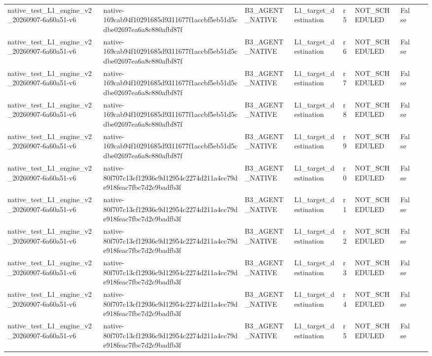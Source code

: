 \begin{tabular}{lllllllll}
native\_test\_L1\_engine\_v2\_20260907-6a60a51-v6 & native-169cab94f10291685d9311677f1accbf5eb51d5cdbe02697ea6a8c880afbf87f & B3\_AGENT\_NATIVE & L1\_target\_destination & r5 & NOT\_SCHEDULED & False &  &  \\
native\_test\_L1\_engine\_v2\_20260907-6a60a51-v6 & native-169cab94f10291685d9311677f1accbf5eb51d5cdbe02697ea6a8c880afbf87f & B3\_AGENT\_NATIVE & L1\_target\_destination & r6 & NOT\_SCHEDULED & False &  &  \\
native\_test\_L1\_engine\_v2\_20260907-6a60a51-v6 & native-169cab94f10291685d9311677f1accbf5eb51d5cdbe02697ea6a8c880afbf87f & B3\_AGENT\_NATIVE & L1\_target\_destination & r7 & NOT\_SCHEDULED & False &  &  \\
native\_test\_L1\_engine\_v2\_20260907-6a60a51-v6 & native-169cab94f10291685d9311677f1accbf5eb51d5cdbe02697ea6a8c880afbf87f & B3\_AGENT\_NATIVE & L1\_target\_destination & r8 & NOT\_SCHEDULED & False &  &  \\
native\_test\_L1\_engine\_v2\_20260907-6a60a51-v6 & native-169cab94f10291685d9311677f1accbf5eb51d5cdbe02697ea6a8c880afbf87f & B3\_AGENT\_NATIVE & L1\_target\_destination & r9 & NOT\_SCHEDULED & False &  &  \\
native\_test\_L1\_engine\_v2\_20260907-6a60a51-v6 & native-80f707c13cf12936c9d12954c2274d211a4cc79de918feac7fbc7d2c9badfb3f & B3\_AGENT\_NATIVE & L1\_target\_destination & r0 & NOT\_SCHEDULED & False &  &  \\
native\_test\_L1\_engine\_v2\_20260907-6a60a51-v6 & native-80f707c13cf12936c9d12954c2274d211a4cc79de918feac7fbc7d2c9badfb3f & B3\_AGENT\_NATIVE & L1\_target\_destination & r1 & NOT\_SCHEDULED & False &  &  \\
native\_test\_L1\_engine\_v2\_20260907-6a60a51-v6 & native-80f707c13cf12936c9d12954c2274d211a4cc79de918feac7fbc7d2c9badfb3f & B3\_AGENT\_NATIVE & L1\_target\_destination & r2 & NOT\_SCHEDULED & False &  &  \\
native\_test\_L1\_engine\_v2\_20260907-6a60a51-v6 & native-80f707c13cf12936c9d12954c2274d211a4cc79de918feac7fbc7d2c9badfb3f & B3\_AGENT\_NATIVE & L1\_target\_destination & r3 & NOT\_SCHEDULED & False &  &  \\
native\_test\_L1\_engine\_v2\_20260907-6a60a51-v6 & native-80f707c13cf12936c9d12954c2274d211a4cc79de918feac7fbc7d2c9badfb3f & B3\_AGENT\_NATIVE & L1\_target\_destination & r4 & NOT\_SCHEDULED & False &  &  \\
native\_test\_L1\_engine\_v2\_20260907-6a60a51-v6 & native-80f707c13cf12936c9d12954c2274d211a4cc79de918feac7fbc7d2c9badfb3f & B3\_AGENT\_NATIVE & L1\_target\_destination & r5 & NOT\_SCHEDULED & False &  &  \\

\end{tabular}
